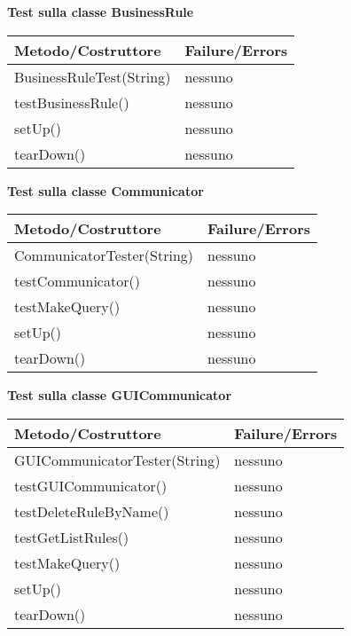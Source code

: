 \textbf{Test sulla classe BusinessRule} \\
\begin{center}
\begin{tabular}{|p{}|p{3 cm}|} \hline
\textbf{Metodo/Costruttore} & \textbf{Failure/Errors} \\ \hline
BusinessRuleTest(String) & nessuno \\ \hline
testBusinessRule() & nessuno \\ \hline
setUp() & nessuno \\ \hline
tearDown() & nessuno \\ \hline
\end{tabular}
\end{center}

\textbf{Test sulla classe Communicator}\\
\begin{center}
\begin{tabular}{|p{}|p{3 cm}|} \hline
\textbf{Metodo/Costruttore} & \textbf{Failure/Errors} \\ \hline
CommunicatorTester(String) & nessuno \\ \hline
testCommunicator() & nessuno \\ \hline
testMakeQuery() & nessuno \\ \hline
setUp() & nessuno \\ \hline
tearDown() & nessuno \\ \hline
\end{tabular}
\end{center}


\textbf{Test sulla classe GUICommunicator}\\
\begin{center}
\begin{tabular}{|p{}|p{3 cm}|} \hline
\textbf{Metodo/Costruttore} & \textbf{Failure/Errors} \\ \hline
GUICommunicatorTester(String) & nessuno \\ \hline
testGUICommunicator() & nessuno \\ \hline
testDeleteRuleByName() & nessuno \\ \hline
testGetListRules() & nessuno \\ \hline
testMakeQuery() & nessuno \\ \hline
setUp() & nessuno \\ \hline
tearDown() & nessuno \\ \hline
\end{tabular}
\end{center}

